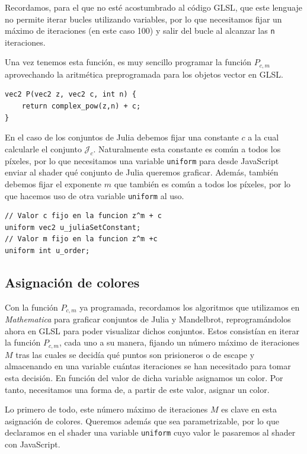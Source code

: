 Recordamos, para el que no esté acostumbrado al código GLSL, que este lenguaje no permite iterar bucles utilizando variables, por lo que necesitamos fijar un máximo de iteraciones (en este caso 100) y salir del bucle al alcanzar las \verb|n| iteraciones.

Una vez tenemos esta función, es muy sencillo programar la función $P_{c,m}$ aprovechando la aritmética preprogramada para los objetos vector en GLSL.

\begin{lstlisting}
vec2 P(vec2 z, vec2 c, int n) {
	return complex_pow(z,n) + c;
}
\end{lstlisting}

En el caso de los conjuntos de Julia debemos fijar una constante $c$ a la cual calcularle el conjunto $\mathcal{J}_c$. Naturalmente esta constante es común a todos los píxeles, por lo que necesitamos una variable \verb|uniform| para desde JavaScript enviar al shader qué conjunto de Julia queremos graficar. Además, también debemos fijar el exponente $m$ que también es común a todos los píxeles, por lo que hacemos uso de otra variable \verb|uniform| al uso.

\begin{lstlisting}
// Valor c fijo en la funcion z^m + c
uniform vec2 u_juliaSetConstant;
// Valor m fijo en la funcion z^m +c
uniform int u_order;
\end{lstlisting}

\subsection{Asignación de colores}
\label{subsection:colores}

Con la función $P_{c,m}$ ya programada, recordamos los algoritmos que utilizamos en \textit{Mathematica} para graficar conjuntos de Julia y Mandelbrot, reprogramándolos ahora en GLSL para poder visualizar dichos conjuntos. Estos consistían en iterar la función $P_{c,m}$, cada uno a su manera, fijando un número máximo de iteraciones $M$ tras las cuales se decidía qué puntos son prisioneros o de escape y almacenando en una variable cuántas iteraciones se han necesitado para tomar esta decisión. En función del valor de dicha variable asignamos un color. Por tanto, necesitamos una forma de, a partir de este valor, asignar un color.

Lo primero de todo, este número máximo de iteraciones $M$ es clave en esta asignación de colores. Queremos además que sea parametrizable, por lo que declaramos en el shader una variable \verb|uniform| cuyo valor le pasaremos al shader con JavaScript.

